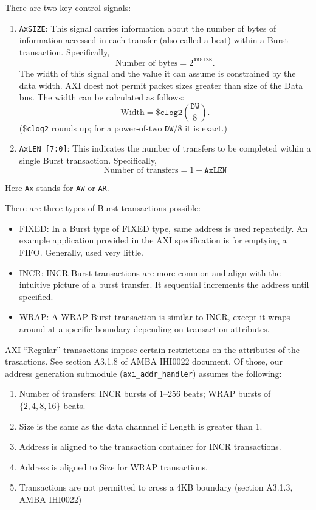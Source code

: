 There are two key control signals:
\begin{enumerate}
    \item \texttt{AxSIZE}: This signal carries information about the number of bytes of information accessed in each transfer (also called a beat) within a Burst transaction. Specifically, 
    \begin{equation*}
        \text{Number of bytes} = 2^{\texttt{AxSIZE}}.
    \end{equation*}
    The width of this signal and the value it can assume is constrained by the data width. AXI doest not permit packet sizes greater than size of the Data bus. The width can be calculated as follows:
    \[
    \text{Width} = \$\texttt{clog2}\left(\frac{\texttt{DW}}{8}\right).
    \]
    (\$\texttt{clog2} rounds up; for a power-of-two \texttt{DW}/8 it is exact.)
    \item \texttt{AxLEN [7:0]}: This indicates the number of transfers to be completed within a single Burst transaction. Specifically,
    \[
    \text{Number of transfers} = 1 + \texttt{AxLEN}
    \] 
\end{enumerate}
Here \texttt{Ax} stands for \texttt{AW} or \texttt{AR}.

There are three types of Burst transactions possible: \begin{itemize}
    \item FIXED: In a Burst type of FIXED type, same address is used repeatedly. An example application provided in the AXI specification is for emptying a FIFO. Generally, used very little.   
    \item INCR: INCR Burst transactions are more common and align with the intuitive picture of a burst transfer. It sequential increments the address until specified.
    \item WRAP: A WRAP Burst transaction is similar to INCR, except it wraps around at a specific boundary depending on transaction attributes. 
\end{itemize}

AXI ``Regular'' transactions impose certain restrictions on the attributes of the trasactions. See section A3.1.8 of AMBA IHI0022 document.  Of those, our address generation submodule (\texttt{axi\_addr\_handler}) assumes the following:
\begin{enumerate}
    \item Number of transfers: INCR bursts of \(1\)--\(256\) beats; WRAP bursts of \(\{2, 4, 8, 16\}\) beats.
    \item Size is the same as the data channnel if Length is greater than 1.
    \item Address is aligned to the transaction container for INCR transactions.
    \item Address is aligned to Size for WRAP transactions.  
    \item Transactions are not permitted to cross a 4KB boundary (section A3.1.3, AMBA IHI0022)
\end{enumerate}

